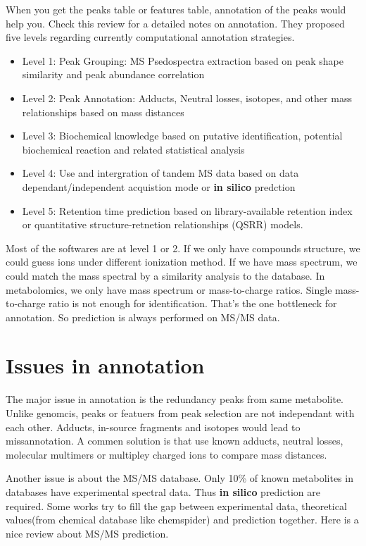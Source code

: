\documentclass[
]{book}
\begin{document}
When you get the peaks table or features table, annotation of the peaks would help you. Check this review\citep{domingo-almenara2018} for a detailed notes on annotation. They proposed five levels regarding currently computational annotation strategies.

\begin{itemize}
\item
  Level 1: Peak Grouping: MS Psedospectra extraction based on peak shape similarity and peak abundance correlation
\item
  Level 2: Peak Annotation: Adducts, Neutral losses, isotopes, and other mass relationships based on mass distances
\item
  Level 3: Biochemical knowledge based on putative identification, potential biochemical reaction and related statistical analysis
\item
  Level 4: Use and intergration of tandem MS data based on data dependant/independent acquistion mode or \textbf{in silico} predction
\item
  Level 5: Retention time prediction based on library-available retention index or quantitative structure-retnetion relationships (QSRR) models.
\end{itemize}

Most of the softwares are at level 1 or 2. If we only have compounds structure, we could guess ions under different ionization method. If we have mass spectrum, we could match the mass spectral by a similarity analysis to the database. In metabolomics, we only have mass spectrum or mass-to-charge ratios. Single mass-to-charge ratio is not enough for identification. That's the one bottleneck for annotation. So prediction is always performed on MS/MS data.

\hypertarget{issues-in-annotation}{%
\section{Issues in annotation}\label{issues-in-annotation}}

The major issue in annotation is the redundancy peaks from same metabolite. Unlike genomcis, peaks or featuers from peak selection are not independant with each other. Adducts, in-source fragments and isotopes would lead to missannotation. A commen solution is that use known adducts, neutral losses, molecular multimers or multipley charged ions to compare mass distances.

Another issue is about the MS/MS database. Only 10\% of known metabolites in databases have experimental spectral data. Thus \textbf{in silico} prediction are required. Some works try to fill the gap between experimental data, theoretical values(from chemical database like chemspider) and prediction together. Here is a nice review about MS/MS prediction\citep{hufsky2014}.
\end{document}
